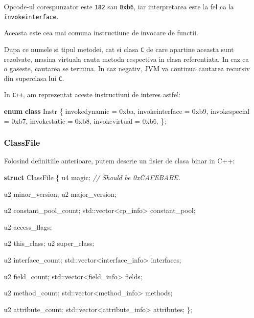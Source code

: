 \documentclass[]{article}
\newenvironment{Shaded}{}{}
\newcommand{\KeywordTok}[1]{\textcolor[rgb]{0.00,0.44,0.13}{\textbf{#1}}}
\newcommand{\BaseNTok}[1]{\textcolor[rgb]{0.25,0.63,0.44}{#1}}
\newcommand{\CommentTok}[1]{\textcolor[rgb]{0.38,0.63,0.69}{\textit{#1}}}
\newcommand{\BuiltInTok}[1]{#1}
\newcommand{\NormalTok}[1]{#1}
\begin{document}
Opcode-ul corespunzator este \texttt{182} sau \texttt{0xb6}, iar
interpretarea este la fel ca la \texttt{invokeinterface}.

Aceasta este cea mai comuna instructiune de invocare de functii.

Dupa ce numele si tipul metodei, cat si clasa \texttt{C} de care
apartine aceasta sunt rezolvate, masina virtuala cauta metoda respectiva
in clasa referentiata. In caz ca o gaseste, cautarea se termina. In caz
negativ, JVM va continua cautarea recursiv din superclasa lui
\texttt{C}.

In \texttt{C++}, am reprezentat aceste instructiuni de interes astfel:

\begin{Shaded}
	\begin{Highlighting}[]
		\KeywordTok{enum} \KeywordTok{class}\NormalTok{ Instr \{}
		\NormalTok{    invokedynamic = }\BaseNTok{0xba}\NormalTok{,}
		\NormalTok{    invokeinterface = }\BaseNTok{0xb9}\NormalTok{,}
		\NormalTok{    invokespecial = }\BaseNTok{0xb7}\NormalTok{,}
		\NormalTok{    invokestatic = }\BaseNTok{0xb8}\NormalTok{,}
		\NormalTok{    invokevirtual = }\BaseNTok{0xb6}\NormalTok{,}
		\NormalTok{\};}
	\end{Highlighting}
\end{Shaded}

\subsubsection{ClassFile}\label{classfile}

Folosind definitiile anterioare, putem descrie un fisier de clasa binar
in C++:

\begin{Shaded}
	\begin{Highlighting}[]
		\KeywordTok{struct}\NormalTok{ ClassFile \{}
		\NormalTok{    u4 magic; }\CommentTok{// Should be 0xCAFEBABE.}

		\NormalTok{    u2 minor_version;}
		\NormalTok{    u2 major_version;}

		\NormalTok{    u2 constant_pool_count;}
		\BuiltInTok{std::}\NormalTok{vector<cp_info> constant_pool;}

		\NormalTok{    u2 access_flags;}

		\NormalTok{    u2 this_class;}
		\NormalTok{    u2 super_class;}

		\NormalTok{    u2 interface_count;}
		\BuiltInTok{std::}\NormalTok{vector<interface_info> interfaces;}

		\NormalTok{    u2 field_count;}
		\BuiltInTok{std::}\NormalTok{vector<field_info> fields;}

		\NormalTok{    u2 method_count;}
		\BuiltInTok{std::}\NormalTok{vector<method_info> methods;}

		\NormalTok{    u2 attribute_count;}
		\BuiltInTok{std::}\NormalTok{vector<attribute_info> attributes;}
		\NormalTok{\};}
	\end{Highlighting}
\end{Shaded}
\end{document}
